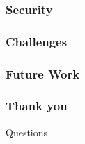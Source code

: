\documentclass{beamer}
\begin{document}
\begin{frame}
    \frametitle{Security}
\end{frame}

\begin{frame}
    \frametitle{Challenges}
\end{frame}

\begin{frame}
    \frametitle{Future Work}
\end{frame}

\begin{frame}
    \frametitle{Thank you}
    Questions
    \centering
\end{frame}
\end{document}
